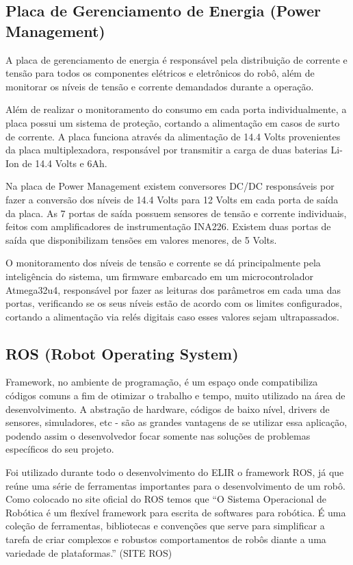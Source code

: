 \subsection{Placa de Gerenciamento de Energia (Power Management)}
A placa de gerenciamento de energia é responsável pela distribuição de corrente e tensão para todos os componentes elétricos e eletrônicos do robô, além de monitorar os níveis de tensão e corrente demandados durante a operação. 

Além de realizar o monitoramento do consumo em cada porta individualmente, a placa possui um sistema de proteção, cortando a alimentação em casos de surto de corrente. A placa funciona através da alimentação de 14.4 Volts provenientes da placa multiplexadora, responsável por transmitir a carga de duas baterias Li-Ion de 14.4 Volts e 6Ah.

Na placa de Power Management existem conversores DC/DC responsáveis por fazer a conversão dos níveis de 14.4 Volts para 12 Volts em cada porta de saída da placa. As 7 portas de saída  possuem sensores de tensão e corrente individuais, feitos com amplificadores de instrumentação INA226. Existem duas portas de saída que disponibilizam tensões em valores menores, de 5 Volts. 

O monitoramento dos níveis de tensão e corrente se dá principalmente pela inteligência do sistema, um firmware embarcado em um microcontrolador Atmega32u4, responsável por fazer as leituras dos parâmetros em cada uma das portas, verificando se os seus níveis estão de acordo com os limites configurados, cortando a alimentação via relés digitais caso esses valores sejam ultrapassados.

\subsection{ROS (Robot Operating System)}
Framework, no ambiente de programação, é um espaço onde compatibiliza códigos comuns a fim de otimizar o trabalho e tempo, muito utilizado na área de desenvolvimento. A abstração de hardware, códigos de baixo nível, drivers de sensores, simuladores, etc - são as grandes vantagens de se utilizar essa aplicação, podendo assim o desenvolvedor focar somente nas soluções de problemas específicos do seu projeto.

Foi utilizado durante todo o desenvolvimento do ELIR o framework ROS, já que reúne uma série de ferramentas importantes para o desenvolvimento de um robô. Como colocado no site oficial do ROS temos que “O Sistema Operacional de Robótica é um flexível framework para escrita de softwares para robótica. É uma coleção de ferramentas, bibliotecas e convenções que serve para simplificar a tarefa de criar complexos e robustos comportamentos de robôs diante a uma variedade de plataformas.” (SITE ROS) 

